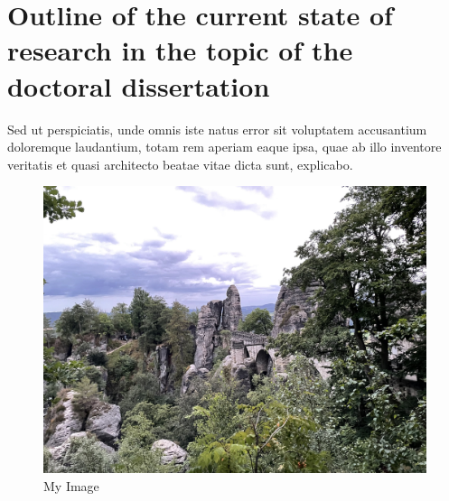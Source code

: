 \section{Outline of the current state of research in the topic of the doctoral dissertation}


Sed ut perspiciatis, unde omnis iste natus error sit voluptatem accusantium doloremque laudantium, totam rem aperiam eaque ipsa, quae ab illo inventore veritatis et quasi architecto beatae vitae dicta sunt, explicabo.

\begin{figure}
    \centering
    \includegraphics[width=\textwidth]{graphics/image.jpg}
    \caption{My Image}
    \label{fig:my_label}
\end{figure}